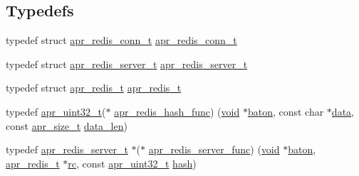 \subsection*{Typedefs}
\begin{DoxyCompactItemize}
\item 
typedef struct \hyperlink{structapr__redis__conn__t}{apr\+\_\+redis\+\_\+conn\+\_\+t} \hyperlink{group__APR__Util__RC_ga5a4ef8d9748b79e176a30b63ab0128a6}{apr\+\_\+redis\+\_\+conn\+\_\+t}
\item 
typedef struct \hyperlink{structapr__redis__server__t}{apr\+\_\+redis\+\_\+server\+\_\+t} \hyperlink{group__APR__Util__RC_ga02345ba6c8fb432d89c74b971473f3e3}{apr\+\_\+redis\+\_\+server\+\_\+t}
\item 
typedef struct \hyperlink{structapr__redis__t}{apr\+\_\+redis\+\_\+t} \hyperlink{group__APR__Util__RC_ga133584a8de2b03e2538a8a1f8d506173}{apr\+\_\+redis\+\_\+t}
\item 
typedef \hyperlink{group__apr__platform_ga558548a135d8a816c4787250744ea147}{apr\+\_\+uint32\+\_\+t}($\ast$ \hyperlink{group__APR__Util__RC_ga2f0c5b75879b3ba94f89bc8e68528bb1}{apr\+\_\+redis\+\_\+hash\+\_\+func}) (\hyperlink{group__MOD__ISAPI_gacd6cdbf73df3d9eed42fa493d9b621a6}{void} $\ast$\hyperlink{group__APR__Util__RC_ga37840dc44e2b0b5a127a6828fffe2a8c}{baton}, const char $\ast$\hyperlink{structdata}{data}, const \hyperlink{group__apr__platform_gaaa72b2253f6f3032cefea5712a27540e}{apr\+\_\+size\+\_\+t} \hyperlink{group__APR__Util__RC_ga371e964d98d4000f4bc080fa4ad81902}{data\+\_\+len})
\item 
typedef \hyperlink{structapr__redis__server__t}{apr\+\_\+redis\+\_\+server\+\_\+t} $\ast$($\ast$ \hyperlink{group__APR__Util__RC_ga7f2fc18eb8f02ba970d7a8bfde2b048c}{apr\+\_\+redis\+\_\+server\+\_\+func}) (\hyperlink{group__MOD__ISAPI_gacd6cdbf73df3d9eed42fa493d9b621a6}{void} $\ast$\hyperlink{group__APR__Util__RC_ga37840dc44e2b0b5a127a6828fffe2a8c}{baton}, \hyperlink{structapr__redis__t}{apr\+\_\+redis\+\_\+t} $\ast$\hyperlink{group__APR__Util__RC_ga38828c1c35a96d3d86edce1458ba991f}{rc}, const \hyperlink{group__apr__platform_ga558548a135d8a816c4787250744ea147}{apr\+\_\+uint32\+\_\+t} \hyperlink{testpass_8c_adfc0cb134ace18ba7fde0fefbae7a391}{hash})
\end{DoxyCompactItemize}
